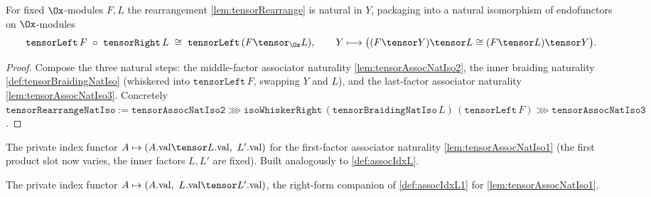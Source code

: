 \begin{lemma}

  \label{lem:tensorRearrange_natIso}
  For fixed $\Ox$-modules $F, L$ the rearrangement \cref{lem:tensorRearrange} is natural
  in $Y$, packaging into a natural isomorphism of endofunctors on $\Ox$-modules
  \[
    \texttt{tensorLeft}\,F \ \circ\ \texttt{tensorRight}\,L
      \;\cong\; \texttt{tensorLeft}\,(F \tensor_{\Ox} L),
    \qquad Y \longmapsto \big((F \tensor Y) \tensor L \cong (F \tensor L) \tensor Y\big).
  \]
  \begin{proof}
    Compose the three natural steps: the middle-factor associator naturality
    \cref{lem:tensorAssocNatIso2}, the inner braiding naturality \cref{def:tensorBraidingNatIso}
    (whiskered into $\texttt{tensorLeft}\,F$, swapping $Y$ and $L$), and the last-factor
    associator naturality \cref{lem:tensorAssocNatIso3}. Concretely
    $\texttt{tensorRearrangeNatIso} := \texttt{tensorAssocNatIso2} \ggg
    \texttt{isoWhiskerRight}\,(\texttt{tensorBraidingNatIso}\,L)\,(\texttt{tensorLeft}\,F) \ggg
    \texttt{tensorAssocNatIso3}$.
  \end{proof}
\end{lemma}

\begin{definition}

  \label{def:assocIdxL1}
  The private index functor $A \mapsto (A.\mathrm{val} \tensor L.\mathrm{val},\ L'.\mathrm{val})$
  for the first-factor associator naturality \cref{lem:tensorAssocNatIso1} (the first product
  slot now varies, the inner factors $L, L'$ are fixed). Built analogously to
  \cref{def:assocIdxL}.
\end{definition}

\begin{definition}

  \label{def:assocIdxR1}
  The private index functor $A \mapsto (A.\mathrm{val},\ L.\mathrm{val} \tensor L'.\mathrm{val})$,
  the right-form companion of \cref{def:assocIdxL1} for \cref{lem:tensorAssocNatIso1}.
\end{definition}

